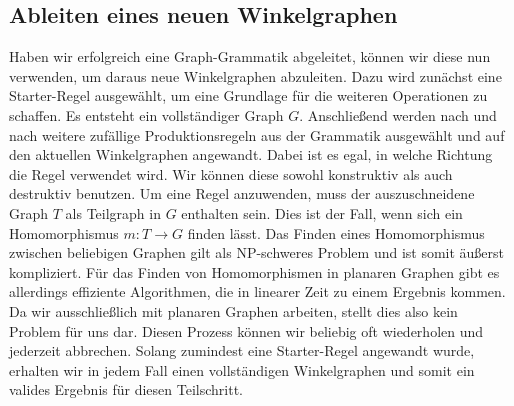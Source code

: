 \subsection{Ableiten eines neuen Winkelgraphen}
Haben wir erfolgreich eine Graph-Grammatik abgeleitet, können wir diese nun verwenden, um daraus neue Winkelgraphen abzuleiten. Dazu wird zunächst eine
Starter-Regel ausgewählt, um eine Grundlage für die weiteren Operationen zu schaffen. Es entsteht ein vollständiger Graph \(G\). Anschließend werden nach
und nach weitere zufällige Produktionsregeln aus der Grammatik ausgewählt und auf den aktuellen Winkelgraphen angewandt. Dabei ist es egal, in welche
Richtung die Regel verwendet wird. Wir können diese sowohl konstruktiv als auch destruktiv benutzen. Um eine Regel anzuwenden, muss der
auszuschneidene Graph \(T\) als Teilgraph in \(G\) enthalten sein. Dies ist der Fall, wenn sich ein Homomorphismus \(m: T \rightarrow G\) finden lässt.
Das Finden eines Homomorphismus zwischen beliebigen Graphen gilt als NP-schweres Problem und
ist somit äußerst kompliziert. \cite{34_cook} Für das Finden von Homomorphismen in planaren Graphen gibt es allerdings effiziente Algorithmen, die in linearer
Zeit zu einem Ergebnis kommen. \cite{8_eppstein} Da wir ausschließlich mit planaren Graphen arbeiten, stellt dies also kein Problem für uns dar. Diesen
Prozess können wir beliebig oft wiederholen und jederzeit abbrechen. Solang zumindest eine Starter-Regel angewandt wurde, erhalten wir in jedem Fall einen
vollständigen Winkelgraphen und somit ein valides Ergebnis für diesen Teilschritt.

